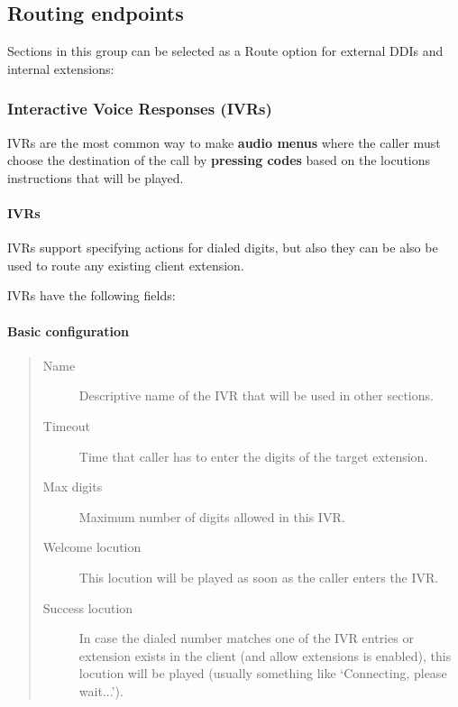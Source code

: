 \documentclass[letterpaper,10pt,english]{sphinxmanual}
\begin{document}
\subsection{Routing endpoints}
\label{administration_portal/client/vpbx/routing_endpoints/index:routing-endpoints}\label{administration_portal/client/vpbx/routing_endpoints/index::doc}
Sections in this group can be selected as a Route option for external DDIs and internal extensions:


\subsubsection{Interactive Voice Responses (IVRs)}
\label{administration_portal/client/vpbx/routing_endpoints/ivrs:interactive-voice-responses-ivrs}\label{administration_portal/client/vpbx/routing_endpoints/ivrs::doc}
IVRs are the most common way to make \textbf{audio menus} where the caller must
choose the destination of the call by \textbf{pressing codes} based on the locutions
instructions that will be played.


\paragraph{IVRs}
\label{administration_portal/client/vpbx/routing_endpoints/ivrs:ivrs}\label{administration_portal/client/vpbx/routing_endpoints/ivrs:id1}
IVRs support specifying actions for dialed digits, but also they can be also be used
to route any existing client extension.

IVRs have the following fields:


\paragraph{Basic configuration}
\label{administration_portal/client/vpbx/routing_endpoints/ivrs:basic-configuration}\begin{quote}
\begin{description}
\item[{Name}] \leavevmode
Descriptive name of the IVR that will be used in other sections.

\item[{Timeout}] \leavevmode
Time that caller has to enter the digits of the target extension.

\item[{Max digits}] \leavevmode
Maximum number of digits allowed in this IVR.

\item[{Welcome locution}] \leavevmode
This locution will be played as soon as the caller enters the IVR.

\item[{Success locution}] \leavevmode
In case the dialed number matches one of the IVR entries or extension
exists in the client (and allow extensions is enabled), this locution
will be played (usually something like `Connecting, please wait...').

\end{description}
\end{quote}
\end{document}
